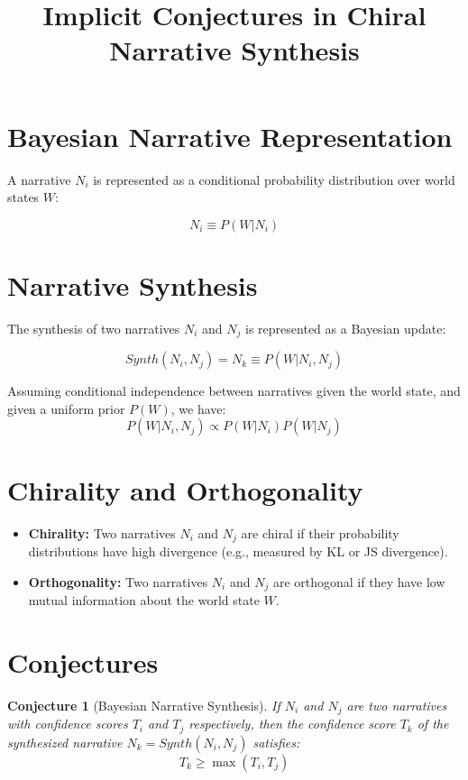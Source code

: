 \documentclass{article}
\title{Implicit Conjectures in Chiral Narrative Synthesis}
\date{}
\newtheorem{conjecture}{Conjecture}
\begin{document}
\maketitle

\section{Bayesian Narrative Representation}

A narrative $N_i$ is represented as a conditional probability distribution over world states $W$:

\[
N_i \equiv P(W|N_i)
\]

\section{Narrative Synthesis}

The synthesis of two narratives $N_i$ and $N_j$ is represented as a Bayesian update:

\[
Synth(N_i, N_j) = N_k \equiv P(W|N_i, N_j)
\]

Assuming conditional independence between narratives given the world state, and given a uniform prior $P(W)$, we have:
\[P(W|N_i, N_j) \propto P(W|N_i) P(W|N_j) \]


\section{Chirality and Orthogonality}

\begin{itemize}
    \item \textbf{Chirality:}  Two narratives $N_i$ and $N_j$ are chiral if their probability distributions have high divergence (e.g., measured by KL or JS divergence).
    \item \textbf{Orthogonality:} Two narratives $N_i$ and $N_j$ are orthogonal if they have low mutual information about the world state $W$.
\end{itemize}

\section{Conjectures}

\begin{conjecture}[Bayesian Narrative Synthesis]
If $N_i$ and $N_j$ are two narratives with confidence scores $T_i$ and $T_j$ respectively, then the confidence score $T_k$ of the synthesized narrative $N_k = Synth(N_i, N_j)$ satisfies:
\[
T_k \ge \max(T_i, T_j)
\]
\end{conjecture}
\end{document}
